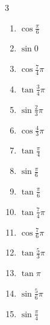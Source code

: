 \begin{multicols}{3}
\begin{enumerate}
  \item $\displaystyle \cos{\frac{\pi}{6}}$

  \item $\displaystyle \sin{0}$
        \phantom{$\displaystyle =0$}

  \item $\displaystyle \cos{\frac{7}{4}\pi}$

\columnbreak %

\resetques

  \item $\displaystyle \tan{\frac{3}{4}\pi}$
        \phantom{$\displaystyle =-1$}

  \item $\displaystyle \sin{\frac{2}{3}\pi}$

  \item $\displaystyle \cos{\frac{4}{3}\pi}$

  \item $\displaystyle \tan{\frac{\pi}{4}}$
        \phantom{$\displaystyle =1$}

  \item $\displaystyle \sin{\frac{\pi}{6}}$

  \item $\displaystyle \tan{\frac{\pi}{6}}$

  \item $\displaystyle \tan{\frac{7}{4}\pi}$
        \phantom{$\displaystyle =-1$}

  \item $\displaystyle \cos{\frac{7}{6}\pi}$

  \item $\displaystyle \tan{\frac{5}{3}\pi}$

  \item $\displaystyle \tan{\pi}$
        \phantom{$\displaystyle =0$}

  \item $\displaystyle \sin{\frac{5}{6}\pi}$

  \item $\displaystyle \sin{\frac{\pi}{4}}$


\end{enumerate}
\end{multicols}

